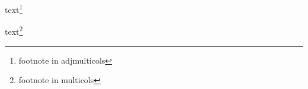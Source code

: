 \documentclass{book}
\begin{document}
\kant[1]
\begin{adjmulticols}{2}{1cm}{-1cm}
\kant[2-5]
text\footnote{footnote in adjmulticols}
\end{adjmulticols}
\kant[6]

\newpage

\kant[1]
\begin{multicols}{2}
\kant[2-5]
text\footnote{footnote in multicols}
\end{multicols}
\kant[6]
\end{document}
